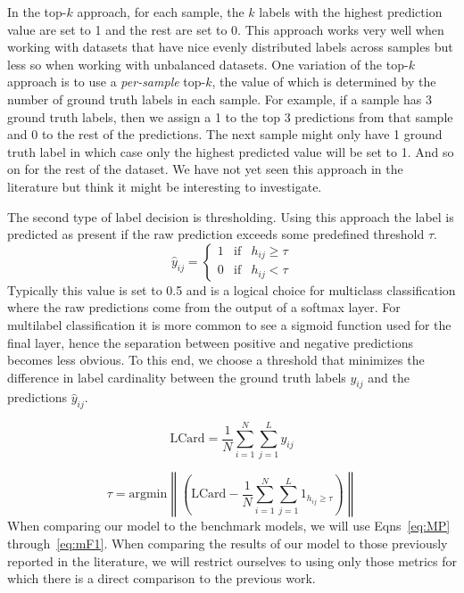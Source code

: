 \documentclass[12pt,journal,compsoc]{IEEEtran}
\begin{document}
In the top-$k$ approach, for each sample, the $k$ labels with the highest prediction value are set to 1 and the rest are set to 0.  This approach works very well when working with datasets that have nice evenly distributed labels across samples but less so when working with unbalanced datasets. One variation of the top-$k$ approach is to use a \textit{per-sample} top-$k$, the value of which is determined by the number of ground truth labels in each sample.  For example, if a sample has 3 ground truth labels, then we assign a 1 to the top 3 predictions from that sample and 0 to the rest of the predictions.  The next sample might only have 1 ground truth label in which case only the highest predicted value will be set to 1.  And so on for the rest of the dataset.  We have not yet seen this approach in the literature but think it might be interesting to investigate.

The second type of label decision is thresholding. Using this approach the label is predicted as present if the raw prediction exceeds some predefined threshold $\tau$. 
\begin{equation}
\hat{y}_{ij} = \left\{
    \begin{array}{lll}
        1 & \mathrm{if} & h_{ij} \geq \tau \\
        0 & \mathrm{if} & h_{ij} < \tau
    \end{array}
\right.
\end{equation}
Typically this value is set to 0.5 and is a logical choice for multiclass classification where the raw predictions come from the output of a softmax layer.  For multilabel classification it is more common to see a sigmoid function used for the final layer, hence the separation between positive and negative predictions becomes less obvious. To this end, we choose a threshold that minimizes the difference in label cardinality between the ground truth labels $y_{ij}$ and the predictions $\hat{y}_{ij}$.~\cite{Read:2011}

\begin{equation}
\mathrm{LCard} = \frac{1}{N}\sum_{i=1}^{N}\sum_{j=1}^{L}y_{ij}
\end{equation}

\begin{equation}
\tau = \mathrm{argmin}\left\|\left(\mathrm{LCard}-\frac{1}{N}\sum_{i=1}^{N}\sum_{j=1}^{L}1_{h_{ij} \geq \tau}\right)\right\|
\end{equation}
When comparing our model to the benchmark models, we will use Eqns~\ref{eq:MP} through~\ref{eq:mF1}. When comparing the results of our model to those previously reported in the literature, we will restrict ourselves to using only those metrics for which there is a direct comparison to the previous work.
\end{document}

